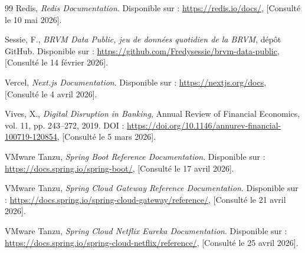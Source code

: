 \begin{thebibliography}{99}
Redis, \textit{Redis Documentation}.
Disponible sur : \url{https://redis.io/docs/}, [Consulté le 10 mai 2026].

Sessie, F., \textit{BRVM Data Public, jeu de données quotidien de la BRVM}, dépôt GitHub.
Disponible sur : \url{https://github.com/Fredysessie/brvm-data-public}, [Consulté le 14 février 2026].

Vercel, \textit{Next.js Documentation}.
Disponible sur : \url{https://nextjs.org/docs}, [Consulté le 4 avril 2026].

Vives, X., \textit{Digital Disruption in Banking}, Annual Review of Financial
Economics, vol. 11, pp. 243--272, 2019.
DOI : \url{https://doi.org/10.1146/annurev-financial-100719-120854}, [Consulté le 5 mars 2026].

VMware Tanzu, \textit{Spring Boot Reference Documentation}.
Disponible sur : \url{https://docs.spring.io/spring-boot/}, [Consulté le 17 avril 2026].

VMware Tanzu, \textit{Spring Cloud Gateway Reference Documentation}.
Disponible sur : \url{https://docs.spring.io/spring-cloud-gateway/reference/}, [Consulté le 21 avril 2026].

VMware Tanzu, \textit{Spring Cloud Netflix Eureka Documentation}.
Disponible sur : \url{https://docs.spring.io/spring-cloud-netflix/reference/}, [Consulté le 25 avril 2026].


\end{thebibliography}
